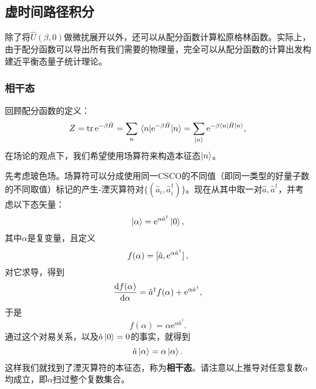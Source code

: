 \documentclass[hyperref, UTF8, a4paper]{ctexart}
\newcommand*{\ee}{\mathrm{e}}
\begin{document}
\subsection{虚时间路径积分}\label{sec:imaginary-path-integral}

除了将$\hat{U}(\beta, 0)$做微扰展开以外，还可以从配分函数计算松原格林函数。实际上，由于配分函数可以导出所有我们需要的物理量，完全可以从配分函数的计算出发构建近平衡态量子统计理论。

\subsubsection{相干态}

回顾配分函数的定义：
\[
    Z = \trace \ee^{- \beta \hat{H}} = \sum_n \mel{n}{\ee^{ - \beta \hat{H}}}{n} = \sum_{\ket{n}} \ee^{ -\beta \mel{n}{\hat{H}}{n}},
\]
在场论的观点下，我们希望使用场算符来构造本征态$\ket{n}$。

先考虑玻色场。场算符可以分成使用同一CSCO的不同值（即同一类型的好量子数的不同取值）标记的产生-湮灭算符对$\{(\hat{a}_i, \hat{a}_i^\dagger)\}$。现在从其中取一对$\hat{a}, \hat{a}^\dagger$，并考虑以下态矢量：
\begin{equation}
    \ket{\alpha} = \ee^{\alpha \hat{a}^\dagger} \ket{0},
\end{equation}
其中$\alpha$是复变量，且定义
\[
    f(\alpha) = \comm*{\hat{a}}{\ee^{\alpha \hat{a}^\dagger}},
\]
对它求导，得到
\[
    \dv{f(\alpha)}{\alpha} = \hat{a}^\dagger f(\alpha) + \ee^{\alpha \hat{a}^\dagger},
\]
于是
\[
    f(\alpha) = \alpha \ee^{\alpha \hat{a}^\dagger}.
\]
通过这个对易关系，以及$\hat{a}\ket{0} = 0$的事实，就得到
\[
    \hat{a} \ket{\alpha} = \alpha \ket{\alpha}.
\]
这样我们就找到了湮灭算符的本征态，称为\textbf{相干态}。请注意以上推导对任意复数$\alpha$均成立，即$\alpha$扫过整个复数集合。
\end{document}
